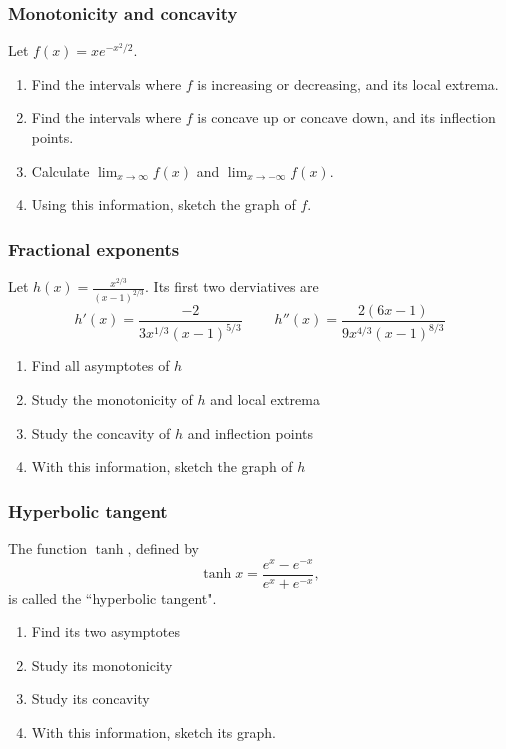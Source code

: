 \begin{frame}[t]
	\frametitle{Monotonicity and concavity}

	Let $\displaystyle f(x) = x e^{-x^2/2}$.

	\begin{enumerate}
		\item Find the intervals where $f$ is increasing or decreasing, and its
			local extrema.

		\item Find the intervals where $f$ is concave up or concave down, and its
			inflection points.

		\item Calculate $\displaystyle \lim_{x \to \infty}f(x)$ and $\displaystyle \lim
			_{x \to - \infty}f(x)$.

		\item Using this information, sketch the graph of $f$.
	\end{enumerate}
\end{frame}

\begin{frame}[t]
	\frametitle{Fractional exponents}

	Let $\displaystyle h(x) = \frac{x^{2/3}}{(x-1)^{2/3}}$. Its first two derviatives
	are
	\begin{equation*}
		h'(x) = \frac{-2}{3x^{1/3}(x-1)^{5/3}}\; \quad \quad h''(x) = \frac{2(6x-1)}{9x^{4/3}(x-1)^{8/3}}
	\end{equation*}

	\begin{enumerate}
		\item Find all asymptotes of $h$

		\item Study the monotonicity of $h$ and local extrema

		\item Study the concavity of $h$ and inflection points

		\item With this information, sketch the graph of $h$
	\end{enumerate}
\end{frame}

\begin{frame}[t]
	\frametitle{Hyperbolic tangent}

	The function $\tanh$, defined by
	\[
		\tanh x = \frac{e^{x}- e^{-x}}{e^{x}+ e^{-x}},
	\]
	is called the ``hyperbolic tangent".
	\begin{enumerate}
		\item Find its two asymptotes

		\item Study its monotonicity

		\item Study its concavity

		\item With this information, sketch its graph.
	\end{enumerate}
\end{frame}

